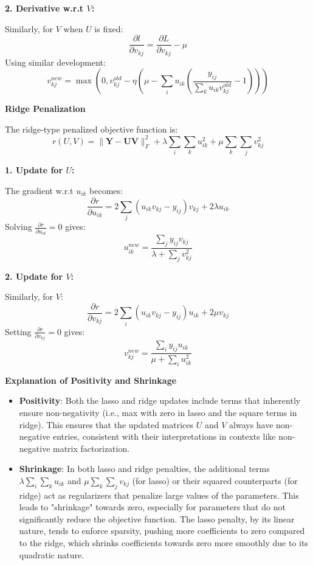 \documentclass[8pt]{article}
\begin{document}
\textbf{2. Derivative w.r.t \(V\):}
   
   Similarly, for \(V\) when \(U\) is fixed:
   \[
   \frac{\partial l}{\partial v_{kj}} = \frac{\partial L}{\partial v_{kj}} - \mu
   \]
   Using similar development:
   \[
   v_{kj}^{new} = \max\left(0, v_{kj}^{old} - \eta \left(\mu - \sum_i u_{ik} \left( \frac{y_{ij}}{\sum_k u_{ik} v_{kj}^{old}} - 1 \right)\right)\right)
   \]

\textbf{Ridge Penalization}

The ridge-type penalized objective function is:
\[
r(U, V) = \|\mathbf{Y} - \mathbf{UV}\|_F^2 + \lambda \sum_i \sum_k u_{ik}^2 + \mu \sum_k \sum_j v_{kj}^2
\]

\textbf{1. Update for \(U\):}
   
   The gradient w.r.t \(u_{ik}\) becomes:
   \[
   \frac{\partial r}{\partial u_{ik}} = 2 \sum_j (u_{ik}v_{kj} - y_{ij}) v_{kj} + 2\lambda u_{ik}
   \]
   Solving \( \frac{\partial r}{\partial u_{ik}} = 0 \) gives:
   \[
   u_{ik}^{new} = \frac{\sum_j y_{ij} v_{kj}}{\lambda + \sum_j v_{kj}^2}
   \]

\textbf{2. Update for \(V\):}
   
   Similarly, for \(V\):
   \[
   \frac{\partial r}{\partial v_{kj}} = 2 \sum_i (u_{ik}v_{kj} - y_{ij}) u_{ik} + 2\mu v_{kj}
   \]
   Setting \( \frac{\partial r}{\partial v_{kj}} = 0 \) gives:
   \[
   v_{kj}^{new} = \frac{\sum_i y_{ij} u_{ik}}{\mu + \sum_i u_{ik}^2}
   \]

\textbf{Explanation of Positivity and Shrinkage}

\begin{itemize}
    \item \textbf{Positivity}: Both the lasso and ridge updates include terms that inherently ensure non-negativity (i.e., max with zero in lasso and the square terms in ridge). This ensures that the updated matrices \(U\) and \(V\) always have non-negative entries, consistent with their interpretations in contexts like non-negative matrix factorization.
    \item \textbf{Shrinkage}: In both lasso and ridge penalties, the additional terms \( \lambda \sum_i \sum_k u_{ik} \) and \( \mu \sum_k \sum_j v_{kj} \) (for lasso) or their squared counterparts (for ridge) act as regularizers that penalize large values of the parameters. This leads to "shrinkage" towards zero, especially for parameters that do not significantly reduce the objective function. The lasso penalty, by its linear nature, tends to enforce sparsity, pushing more coefficients to zero compared to the ridge, which shrinks coefficients towards zero more smoothly due to its quadratic nature.
\end{itemize}
\end{document}
